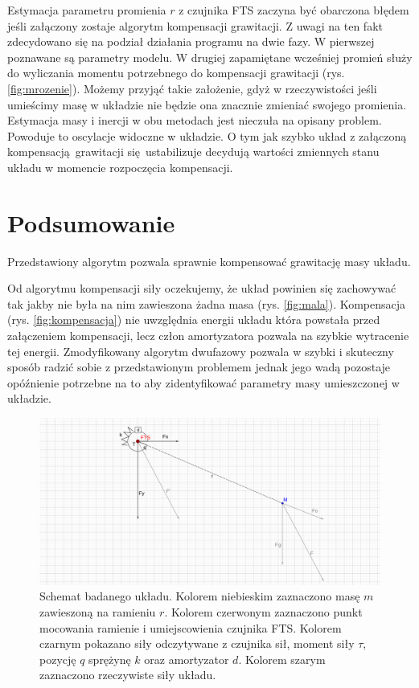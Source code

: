 \documentclass[a4paper, 10pt]{article}
\begin{document}
Estymacja parametru promienia $r$ z czujnika FTS zaczyna być obarczona błędem jeśli załączony zostaje algorytm kompensacji grawitacji. Z uwagi na ten fakt zdecydowano się na podział działania programu na dwie fazy. W pierwszej poznawane są parametry modelu. W drugiej zapamiętane wcześniej promień służy do wyliczania momentu potrzebnego do kompensacji grawitacji (rys. \ref{fig:mrozenie}). Możemy przyjąć takie założenie, gdyż w rzeczywistości jeśli umieścimy masę w układzie nie będzie ona znacznie zmieniać swojego promienia. Estymacja masy i inercji w obu metodach jest nieczuła na opisany problem. Powoduje to oscylacje widoczne w układzie. O tym jak szybko układ z załączoną kompensacją grawitacji się ustabilizuje decydują wartości zmiennych stanu układu w momencie rozpoczęcia kompensacji.\\



\section{Podsumowanie}

Przedstawiony algorytm pozwala sprawnie kompensować grawitację masy układu.

Od algorytmu kompensacji siły oczekujemy, że układ powinien się zachowywać tak jakby nie była na nim zawieszona żadna masa (rys. \ref{fig:mala}). Kompensacja (rys. \ref{fig:kompensacja}) nie uwzględnia energii układu która powstała przed załączeniem kompensacji, lecz człon amortyzatora pozwala na szybkie wytracenie tej energii. Zmodyfikowany algorytm dwufazowy pozwala w szybki i skuteczny sposób radzić sobie z przedstawionym problemem jednak jego wadą pozostaje opóźnienie potrzebne na to aby zidentyfikować parametry masy umieszczonej w układzie.





\begin{figure}[H]
	\includegraphics[width=0.99\linewidth]{2d}
	\centering
	\caption{Schemat badanego układu. Kolorem niebieskim zaznaczono masę $m$ zawieszoną na ramieniu $r$. Kolorem czerwonym zaznaczono punkt mocowania ramienie i umiejscowienia czujnika FTS. Kolorem czarnym pokazano siły odczytywane z czujnika sił, moment siły $\tau$, pozycję $q$ sprężynę $k$ oraz amortyzator $d$. Kolorem szarym zaznaczono rzeczywiste siły układu.}
	\label{fig:2d}
\end{figure}
\end{document}
